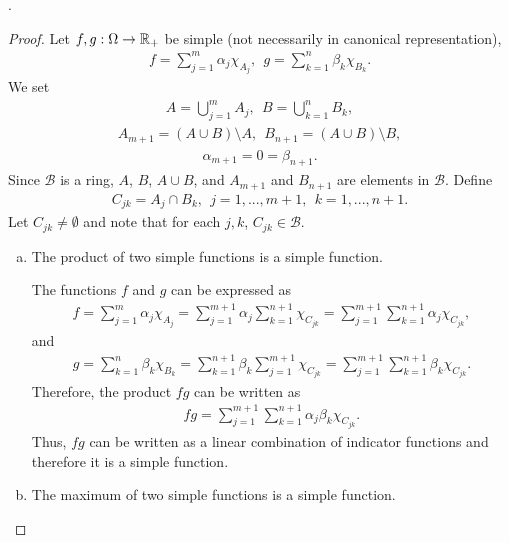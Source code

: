\begin{questions}

.

\begin{solution}
  \begin{proof}
Let $f, g : \Omega\rightarrow \mathbb{R}_+$ be simple (not necessarily in canonical representation),
\begin{align*}
f =\sum_{j=1}^m\alpha_j\chi_{A_j},~~g =\sum_{k=1}^n\beta_k\chi_{B_k}.
\end{align*}
We set
\begin{align*}
A=\bigcup_{j=1}^mA_j,~~B=\bigcup_{k=1}^nB_k,
\end{align*}
\begin{align*}
A_{m+1}=(A\cup B)\setminus A,~~B_{n+1}=(A\cup B)\setminus B,
\end{align*}
\begin{align*}
\alpha_{m+1} = 0 =\beta_{n+1}.
\end{align*}
Since $\mathcal{B}$ is a ring, $A$, $B$, $A\cup B$, and $A_{m+1}$ and $B_{n+1}$ are elements in $\mathcal{B}$.
Define
\begin{align*}
C_{jk}=A_j\cap B_k,~~j=1,...,m+1,~~k=1,...,n+1.
\end{align*}
Let $C_{jk}\neq\emptyset$ and note that for each $j,k$, $C_{jk}\in\mathcal{B}$. 
\begin{enumerate}[a)]
\item The product of two simple functions is a simple function.

The functions $f$ and $g$ can be expressed as
\begin{align*}
f=\sum_{j=1}^m\alpha_j\chi_{A_j}=\sum_{j=1}^{m+1}\alpha_j\sum_{k=1}^{n+1}\chi_{C_{jk}}=\sum_{j=1}^{m+1}\sum_{k=1}^{n+1}\alpha_j\chi_{C_{jk}},
\end{align*}
and
\begin{align*}
g=\sum_{k=1}^n\beta_k\chi_{B_k}=\sum_{k=1}^{n+1}\beta_k\sum_{j=1}^{m+1}\chi_{C_{jk}}=\sum_{j=1}^{m+1}\sum_{k=1}^{n+1}\beta_k\chi_{C_{jk}}.
\end{align*}
Therefore, the product $fg$ can be written as
\begin{align*}
fg=\sum_{j=1}^{m+1}\sum_{k=1}^{n+1}\alpha_j\beta_k\chi_{C_{jk}}.
\end{align*}
Thus, $fg$ can be written as a linear combination of indicator functions and therefore it is a simple function.
\item The maximum of two simple functions is a simple function.


\end{enumerate}
\end{proof}
\end{solution}
\end{questions}
